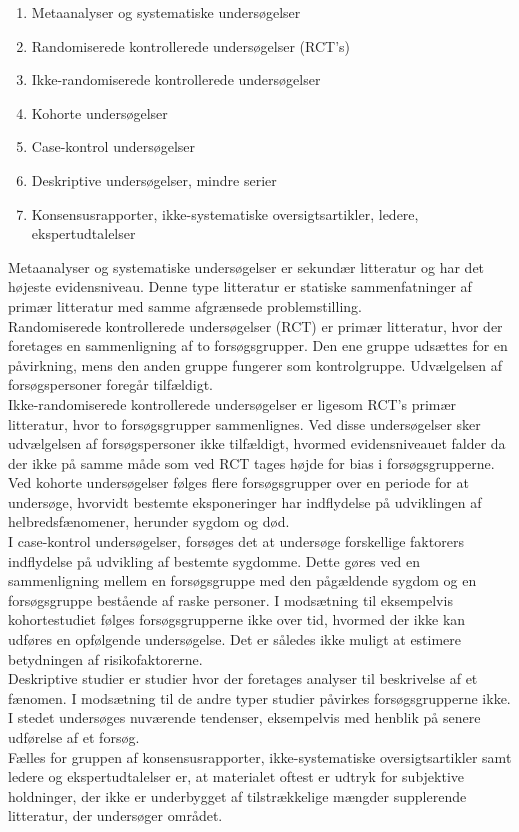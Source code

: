\begin{enumerate}
\item Metaanalyser og systematiske undersøgelser 
\item Randomiserede kontrollerede undersøgelser (RCT’s)
\item Ikke-randomiserede kontrollerede undersøgelser
\item Kohorte undersøgelser
\item Case-kontrol undersøgelser
\item Deskriptive undersøgelser, mindre serier
\item Konsensusrapporter, ikke-systematiske oversigtsartikler, ledere, ekspertudtalelser
\end{enumerate}

Metaanalyser og systematiske undersøgelser er sekundær litteratur og har det højeste evidensniveau. Denne type litteratur er statiske sammenfatninger af primær litteratur med samme afgrænsede problemstilling. \citep{denstoredanske2009} \\
Randomiserede kontrollerede undersøgelser (RCT) er primær litteratur, hvor der foretages en sammenligning af to forsøgsgrupper. Den ene gruppe udsættes for en påvirkning, mens den anden gruppe fungerer som kontrolgruppe. Udvælgelsen af forsøgspersoner foregår tilfældigt. \citep{denstoredanske2009a} \\
Ikke-randomiserede kontrollerede undersøgelser er ligesom RCT’s primær litteratur, hvor to forsøgsgrupper sammenlignes. Ved disse undersøgelser sker udvælgelsen af forsøgspersoner ikke tilfældigt, hvormed evidensniveauet falder da der ikke på samme måde som ved RCT tages højde for bias i forsøgsgrupperne. \citep{denstoredanske2009a} \\
Ved kohorte undersøgelser følges flere forsøgsgrupper over en periode for at undersøge, hvorvidt bestemte eksponeringer har indflydelse på udviklingen af helbredsfænomener, herunder sygdom og død. \citep{metodehaandbogen} \\
I case-kontrol undersøgelser, forsøges det at undersøge forskellige faktorers indflydelse på udvikling af bestemte sygdomme. Dette gøres ved en sammenligning mellem en forsøgsgruppe med den pågældende sygdom og en forsøgsgruppe bestående af raske personer. I modsætning til eksempelvis kohortestudiet følges forsøgsgrupperne ikke over tid, hvormed der ikke kan udføres en opfølgende undersøgelse. Det er således ikke muligt at estimere betydningen af  risikofaktorerne. \citep{denstoredanske2012} \\
Deskriptive studier er studier hvor der foretages analyser til beskrivelse af et fænomen. I modsætning til de andre typer studier påvirkes forsøgsgrupperne ikke. I stedet undersøges nuværende tendenser, eksempelvis med henblik på senere udførelse af et forsøg. \citep{} \\
Fælles for gruppen af konsensusrapporter, ikke-systematiske oversigtsartikler samt ledere og ekspertudtalelser er, at materialet oftest er udtryk for subjektive holdninger, der ikke er underbygget af tilstrækkelige mængder supplerende litteratur, der undersøger området. \citep{metodehaandbogen}  